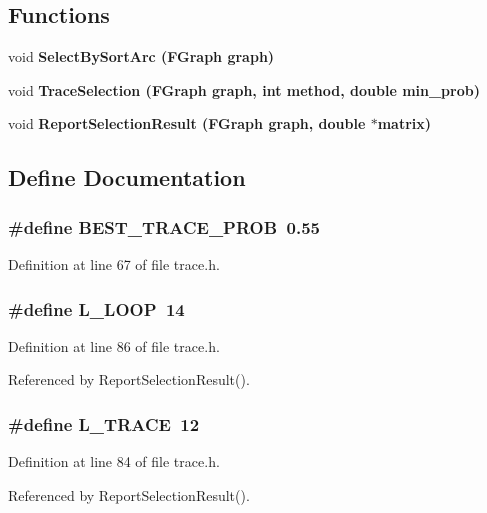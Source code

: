 \subsection*{Functions}
\begin{CompactItemize}
\item 
void \bf{Select\-By\-Sort\-Arc} (\bf{FGraph} \bf{graph})
\item 
void \bf{Trace\-Selection} (\bf{FGraph} \bf{graph}, int method, double min\_\-prob)
\item 
void \bf{Report\-Selection\-Result} (\bf{FGraph} \bf{graph}, double $\ast$matrix)
\end{CompactItemize}


\subsection{Define Documentation}
\subsubsection{\setlength{\rightskip}{0pt plus 5cm}\#define BEST\_\-TRACE\_\-PROB~0.55}\label{trace_8h_93d40730246e6530afce9a8aebe3ebcb}




Definition at line 67 of file trace.h.
\subsubsection{\setlength{\rightskip}{0pt plus 5cm}\#define L\_\-LOOP~14}\label{trace_8h_299b4f73f3c302458a7ef7f68cf7a25b}




Definition at line 86 of file trace.h.

Referenced by Report\-Selection\-Result().
\subsubsection{\setlength{\rightskip}{0pt plus 5cm}\#define L\_\-TRACE~12}\label{trace_8h_a15a64659bb3a58d01f3fd568f27de83}




Definition at line 84 of file trace.h.

Referenced by Report\-Selection\-Result().
